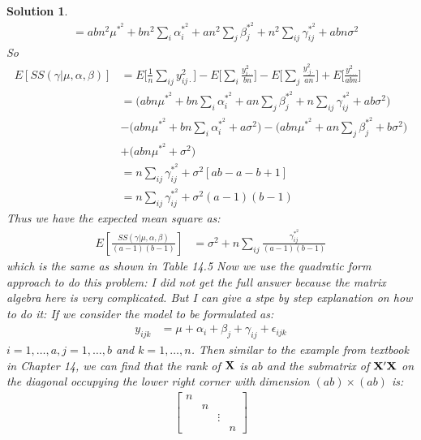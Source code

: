 \documentclass[11pt]{article}
\newtheorem{sol}{Solution}
\begin{document}
\begin{sol}
\begin{align*}
		&= abn^2\mu^{\ast^2} + bn^2\sum_i\alpha_i^{\ast^2} + an^2\sum_j\beta_j^{\ast^2} + n^2\sum_{ij}\gamma_{ij}^{\ast^2} + abn\sigma^2
	\end{align*}
	So
	\begin{align*}
		E[SS(\gamma|\mu, \alpha, \beta)] &= E\Big[\frac{1}{n}\sum_{ij}y^2_{ij\cdot}\Big] - E\Big[\sum_i\frac{y^2_{i\cdot\cdot}}{bn}\Big] - E\Big[\sum_j \frac{y^2_{\cdot j\cdot}}{an}\Big] + E\Big[\frac{y^2_{\cdot\cdot\cdot}}{abn}\Big]\\
		&= \Big(abn\mu^{\ast^2} + bn\sum_i\alpha_i^{\ast^2} + an\sum_j\beta_j^{\ast^2} + n\sum_{ij}\gamma_{ij}^{\ast^2} + ab\sigma^2\Big)\\
		& - \Big(abn\mu^{\ast^2} + bn\sum_i\alpha_i^{\ast^2} + a\sigma^2\Big) 
		- \Big(abn\mu^{\ast^2} + an\sum_{j}\beta_j^{\ast^2} + b\sigma^2\Big)\\
		&+ \Big(abn\mu^{\ast^2} + \sigma^2\Big)\\
		&= n\sum_{ij}\gamma_{ij}^{\ast^2} + \sigma^2[ab - a - b + 1]\\
		&= n\sum_{ij}\gamma_{ij}^{\ast^2} + \sigma^2(a - 1)(b - 1)
	\end{align*}
	Thus we have the expected mean square as:
	\begin{align*}
		E[\frac{SS(\gamma|\mu, \alpha, \beta)}{(a-1)(b - 1)}] &= \sigma^2 + n\sum_{ij}\frac{\gamma^{\ast^2}_{ij}}{(a - 1)(b - 1)}
	\end{align*}
	which is the same as shown in Table 14.5\vskip 2mm
	Now we use the quadratic form approach to do this problem:\vskip 2mm
	I did not get the full answer because the matrix algebra here is very complicated. But I can give a stpe by step explanation on how to do it:\vskip 2mm
	If we consider the model to be formulated as:
	\begin{align*}
		y_{ijk} &= \mu + \alpha_i + \beta_j + \gamma_{ij} + \epsilon_{ijk}
	\end{align*}
	$i = 1, \ldots, a, j = 1, \ldots, b$ and $k = 1, \ldots, n$.\vskip 2mm
	Then similar to the example from textbook in Chapter 14, we can find that the rank of ${\bf X}$ is $ab$ and the submatrix of ${\bf X}'{\bf X}$ on the diagonal occupying the lower right corner with dimension $(ab) \times (ab)$ is:
	\begin{align*}
		\left[\begin{array}{ccccc} n&&&\\ &n&&\\ &&\vdots&\\ &&&n\end{array}\right]
	\end{align*}

\end{sol}
\end{document}
